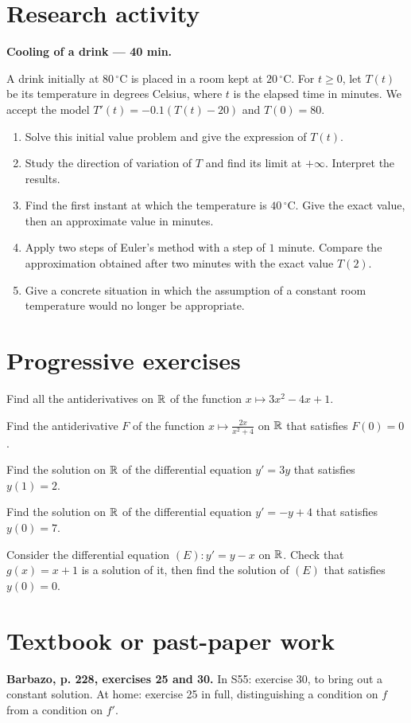 \section{Research activity}\textbf{Cooling of a drink --- 40 min.}\par A drink initially at $80\,^{\circ}\mathrm C$ is placed in a room kept at $20\,^{\circ}\mathrm C$. For $t\ge0$, let $T(t)$ be its temperature in degrees Celsius, where $t$ is the elapsed time in minutes. We accept the model $T' (t)=-0.1(T(t)-20)$ and $T(0)=80$.
\begin{enumerate}\item Solve this initial value problem and give the expression of $T(t)$.
\item Study the direction of variation of $T$ and find its limit at $+\infty$. Interpret the results.
\item Find the first instant at which the temperature is $40\,^{\circ}\mathrm C$. Give the exact value, then an approximate value in minutes.
\item Apply two steps of Euler's method with a step of $1$ minute. Compare the approximation obtained after two minutes with the exact value $T(2)$.
\item Give a concrete situation in which the assumption of a constant room temperature would no longer be appropriate.\end{enumerate}

\section{Progressive exercises}

Find all the antiderivatives on $\mathbb R$ of the function $x\mapsto3x^2-4x+1$.

Find the antiderivative $F$ of the function $x\mapsto\frac{2x}{x^2+4}$ on $\mathbb R$ that satisfies $F(0)=0$.

Find the solution on $\mathbb R$ of the differential equation $y' =3y$ that satisfies $y(1)=2$.

Find the solution on $\mathbb R$ of the differential equation $y' =-y+4$ that satisfies $y(0)=7$.

Consider the differential equation $(E):y' =y-x$ on $\mathbb R$. Check that $g(x)=x+1$ is a solution of it, then find the solution of $(E)$ that satisfies $y(0)=0$.

\section{Textbook or past-paper work}\textbf{Barbazo, p. 228, exercises 25 and 30.} In S55: exercise 30, to bring out a constant solution. At home: exercise 25 in full, distinguishing a condition on $f$ from a condition on $f'$.

